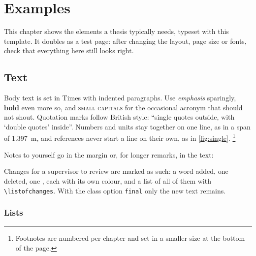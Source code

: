 \chapter{Examples}\label{ch:examples} \pagestyle{mainmatter}
\chapterprecishere{}
\chapterprecistoc{}

This chapter shows the elements a thesis typically needs, typeset with this template. It doubles as a test page: after changing the layout, page size or fonts, check that everything here still looks right.

\section{Text}\label{sec:text}

Body text is set in Times with indented paragraphs. Use \emph{emphasis} sparingly, \textbf{bold} even more so, and \textsc{small capitals} for the occasional acronym that should not shout. Quotation marks follow British style: \enquote{single quotes outside, with \enquote{double quotes} inside}. Numbers and units stay together on one line, as in a span of \qty{1.397}{\metre}, and references never start a line on their own, as in \cref{fig:single}.%
\footnote{Footnotes are numbered per chapter and set in a smaller size at the bottom of the page.}

Notes to yourself go in the margin or, for longer remarks, in the text:

Changes for a supervisor to review are marked as such: a word  added, one  deleted, one , each with its own colour, and a list of all of them with \verb|\listofchanges|. With the class option \texttt{final} only the new text remains.

\subsection{Lists}

